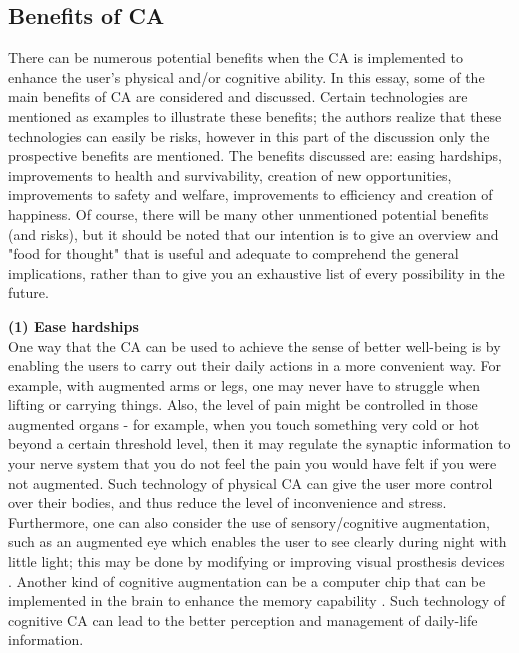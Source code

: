 \subsection{Benefits of CA}

There can be numerous potential benefits when the CA is implemented to enhance the user's physical and/or cognitive ability. In this essay, some of the main benefits of CA are considered and discussed. Certain technologies are mentioned as examples to illustrate these benefits; the authors realize that these technologies can easily be risks, however in this part of the discussion only the prospective benefits are mentioned. The benefits discussed are: easing hardships, improvements to health and survivability, creation of new opportunities, improvements to safety and welfare, improvements to efficiency and creation of happiness. Of course, there will be many other unmentioned potential benefits (and risks), but it should be noted that our intention is to give an overview and "food for thought" that is useful and adequate to comprehend the general implications, rather than to give you an exhaustive list of every possibility in the future. 

{\bf (1) Ease hardships} \\ 
One way that the CA can be used to achieve the sense of better well-being is by enabling the users to carry out their daily actions in a more convenient way. For example, with augmented arms or legs, one may never have to struggle when lifting or carrying things. Also, the level of pain might be controlled in those augmented organs - for example, when you touch something very cold or hot beyond a certain threshold level, then it may regulate the synaptic information to your nerve system that you do not feel the pain you would have felt if you were not augmented. Such technology of physical CA can give the user more control over their bodies, and thus reduce the level of inconvenience and stress. Furthermore, one can also consider the use of sensory/cognitive augmentation, such as an augmented eye which enables the user to see clearly during night with little light; this may be done by modifying or improving visual prosthesis devices \cite{shepherd2013visual}. Another kind of cognitive augmentation can be a computer chip that can be implemented in the brain to enhance the memory capability \cite{berger2011cortical}. Such technology of cognitive CA can lead to the better perception and management of daily-life information.

